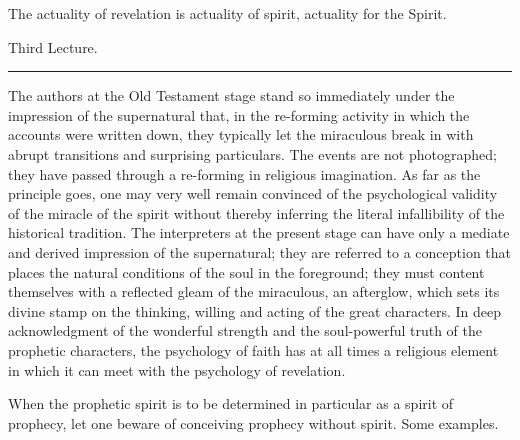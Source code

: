 \documentclass[12pt,a4paper,openany]{book}
\newcommand{\opage}[1]{\marginnote{\footnotesize\textit{[#1]}}}
\newcommand{\lecture}[1]{\clearpage\begin{center}{\large #1}\\[0.4em]\rule{3em}{0.4pt}\end{center}\medskip\noindent}
\begin{document}
The actuality of revelation is actuality of spirit, actuality
for the Spirit.

\setcounter{footnote}{0}%
\lecture{Third Lecture.}\opage{39}The authors at the Old Testament stage stand
so immediately under the impression of the supernatural that,
in the re-forming activity in which the accounts
were written down, they typically let the miraculous break
in with abrupt transitions and surprising particulars.
The events are not photographed; they have
passed through a re-forming in religious imagination.
As far as the principle goes, one may very well remain
convinced of the psychological validity of the miracle of the spirit
without thereby inferring the literal infallibility
of the historical tradition. The interpreters at the present
stage can have only a mediate and derived impression
of the supernatural; they are referred to a conception
that places the natural conditions of the soul in the foreground;
they must content themselves with a reflected gleam of the
miraculous, an afterglow, which sets its divine
stamp on the thinking, willing and acting of the great characters.
In deep acknowledgment of the wonderful strength and the
soul-powerful truth of the prophetic characters,
the psychology of faith has at all times a religious element
in which it can meet with the psychology of revelation.


\setcounter{footnote}{0}%
\opage{40}When the prophetic spirit is to be determined in particular
as a spirit of prophecy, let one beware of
conceiving prophecy without spirit. Some examples.
\end{document}
